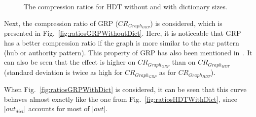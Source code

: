 \begin{figure}[h]
	\centering
	\hfill
	\caption{The compression ratios for HDT without and with dictionary sizes.}
\end{figure}

Next, the compression ratio of GRP ($CR_{Graph_{GRP}}$) is considered, which is presented in Fig.~\ref{fig:ratiosGRPWithoutDict}. Here, it is noticeable that GRP has a better compression ratio if the graph is more similar to the star pattern (hub or authority pattern). This property of GRP has also been mentioned in~\cite{maneth}. It can also be seen that the effect is higher on $CR_{Graph_{GRP}}$ than on  $CR_{Graph_{HDT}}$ (standard deviation is twice as high for $CR_{Graph_{GRP}}$ as for $CR_{Graph_{HDT}}$). 

When Fig.~\ref{fig:ratiosGRPWithDict} is considered, it can be seen that this curve behaves almost exactly like the one from Fig.~\ref{fig:ratiosHDTWithDict}, since $|out_{dict}|$ accounts for most of $|out|$.

